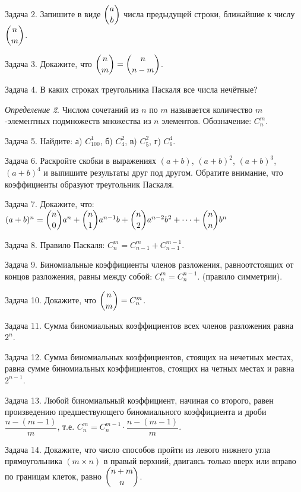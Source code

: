 \documentclass[12pt]{article}
\begin{document}
Задача 2. Запишите в виде $\dbinom{a}{b}$ числа предыдущей строки, ближайшие к числу $\dbinom{n}{m}$.

Задача 3. Докажите, что $\dbinom{n}{m}=\dbinom{n}{n-m}$.

Задача 4. В каких строках треугольника Паскаля все числа нечётные?

\textit{Определение 2}. Числом сочетаний из $n$ по $m$ называется количество $m$-элементных подмножеств множества из $n$ элементов. Обозначение: $C_n^m$.

Задача 5. Найдите: а) $C_{100}^1$, б) $C_4^2$, в) $C_5^2$, г) $C_6^4$.

Задача 6. Раскройте скобки в выражениях $(a+b)$, $(a+b)^2$, $(a+b)^3$, $(a+b)^4$ и выпишите результаты друг под другом.
Обратите внимание, что коэффициенты образуют треугольник Паскаля.
 
Задача 7. Докажите, что: $(a+b)^n = \dbinom{n}{0}a^n+\dbinom{n}{1}a^{n-1}b+\dbinom{n}{2}a^{n-2}b^2+\dots+\dbinom{n}{n}b^n$

Задача 8. Правило Паскаля: $C_n^m=C_{n-1}^m+C_{n-1}^{m-1}$.

Задача 9. Биномиальные коэффициенты членов разложения, равноотстоящих от концов разложения, равны между собой:
$C_n^m=C_n^{n-1}$. (правило симметрии).
 
Задача 10. Докажите, что $\dbinom{n}{m}=C_n^m$.

Задача 11. Сумма биномиальных коэффициентов всех членов разложения равна $2^n$.

Задача 12. Сумма биномиальных коэффициентов, стоящих на нечетных местах, равна сумме биномиальных коэффициентов, стоящих на четных местах и равна $2^{n-1}$.

Задача 13. Любой биномиальный коэффициент, начиная со второго, равен произведению предшествующего биномиального коэффициента и дроби $\dfrac{n-(m-1)}{m}$, т.е. $C_n^m=C_n^{m-1}\cdot\dfrac{n-(m-1)}{m}$.

Задача 14. Докажите, что число способов пройти из левого нижнего угла прямоугольника $(m \times n)$ в правый верхний, двигаясь только вверх или вправо по границам клеток, равно $\dbinom{n+m}{n}$.
	
\end{document}
